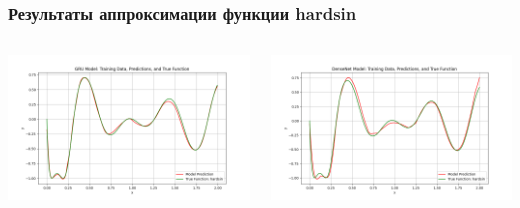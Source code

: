 \documentclass
  [ russian
  , aspectratio=1610 %
  ] {beamer}
\begin{document}
\begin{frame}
    \frametitle{Результаты аппроксимации функции hardsin}
    \begin{columns}
        \begin{column}{0.5\textwidth}
            \centering
            \includegraphics[width=1.1\textwidth]{figures/ch_hardsin_500eph_gru_apr_plot.png}
        \end{column}
        \begin{column}{0.5\textwidth}
            \centering
            \includegraphics[width=1.1\textwidth]{figures/ch_hardsin_500eph_dense_apr_plot.png}
        \end{column}
    \end{columns}
\end{frame}
\end{document}
